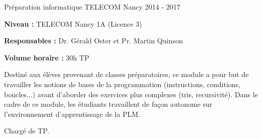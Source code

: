 \documentclass[12pt, a4paper]{awesome-cv}
\begin{document}
\begin{cventries}
  \cventry
  {Préparation informatique} %
  {TELECOM Nancy} %
  {} %
  {2014 - 2017} %
  {
    \begin{cvitems}
      \item {\textbf{Niveau : } TELECOM Nancy 1A (Licence 3)}
      \item {\textbf{Responsables : } Dr. Gérald Oster et Pr. Martin Quinson}
      \item {\textbf{Volume horaire : } 30h TP}
    \end{cvitems}
  }

  \begin{cvparagraph}
    Destiné aux élèves provenant de classes préparatoires, ce module a pour but de travailler les notions de bases de la programmation (instructions, conditions, boucles...) avant d'aborder des exercices plus complexes (tris, recursivité).
    Dans le cadre de ce module, les étudiants travaillent de façon autonome sur l'environnement d'apprentissage de la PLM.
  \end{cvparagraph}

  \begin{cvparagraph}
    Chargé de TP.
  \end{cvparagraph}

\end{cventries}

\end{document}
